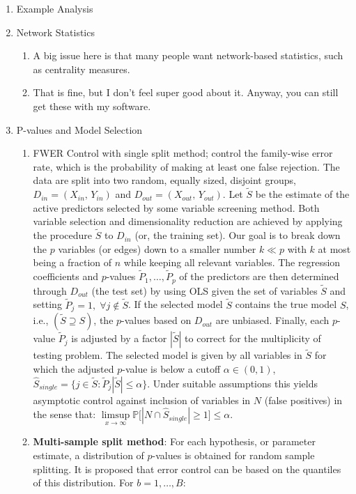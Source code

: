 \begin{enumerate}
\begin{enumerate}
    \end{enumerate}
    \item Example Analysis
    \item Network Statistics
    \begin{enumerate}
        \item A big issue here is that many people want network-based statistics, such as centrality measures. 
        \item That is fine, but I don't feel super good about it. Anyway, you can still get these with my software.
    \end{enumerate}
    \item P-values and Model Selection
    \begin{enumerate}
        \item FWER Control with single split method; control the family-wise error rate, which is the probability of making at least one false rejection. The data are split into two random, equally sized, disjoint groups, $D_{in} = (X_{in},\,Y_{in})$ and $D_{out} = (X_{out},\,Y_{out})$. Let $\tilde{S}$ be the estimate of the active predictors selected by some variable screening method. Both variable selection and dimensionality reduction are achieved by applying the procedure $\tilde{S}$ to $D_{in}$ (or, the training set). Our goal is to break down the $p$ variables (or edges) down to a smaller number $k \ll p$ with $k$ at most being a fraction of $n$ while keeping all relevant variables. The regression coefficients and $p$-values $\tilde{P}_1,\ldots,\tilde{P}_p$ of the predictors are then determined through $D_{out}$ (the test set) by using OLS given the set of variables $\tilde{S}$ and setting $\tilde{P}_j = 1,\;\forall j \notin \tilde{S}$. If the selected model $\tilde{S}$ contains the true model $S$, i.e., $(\tilde{S} \supseteq S)$, the $p$-values based on $D_{out}$ are unbiased. Finally, each $p$-value $\tilde{P}_j$ is adjusted by a factor $|\tilde{S}|$ to correct for the multiplicity of testing problem. The selected model is given by all variables in $\tilde{S}$ for which the adjusted $p$-value is below a cutoff $\alpha \in (0, 1)$, $\hat{S}_{single} = \big\{ j \in \tilde{S}:\tilde{P}_j |\tilde{S}| \leq \alpha \big\}$. Under suitable assumptions this yields asymptotic control against inclusion of variables in $N$ (false positives) in the sense that: $\limsup\limits_{x\rightarrow\infty}\mathbb{P}\big\lbrack|N\cap\hat{S}_{single}|\geq1\big\rbrack\leq\alpha$.
        \item \textbf{Multi-sample split method}: For each hypothesis, or parameter estimate, a distribution of $p$-values is obtained for random sample splitting. It is proposed that error control can be based on the quantiles of this distribution. For $b = 1,\ldots,B$:

\end{enumerate}
\end{enumerate}
